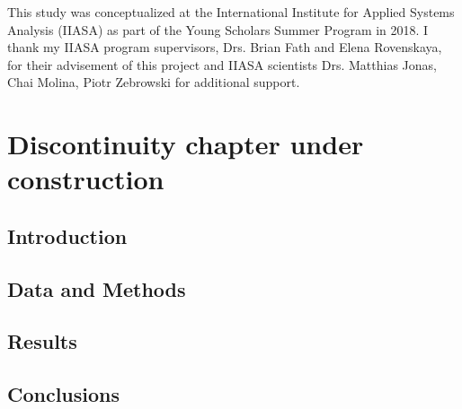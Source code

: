 \documentclass[12pt,twoside,openany]{reedthesis}
\begin{document}
This study was conceptualized at the International Institute for Applied Systems Analysis (IIASA) as part of the Young Scholars Summer Program in 2018. I thank my IIASA program supervisors, Drs. Brian Fath and Elena Rovenskaya, for their advisement of this project and IIASA scientists Drs. Matthias Jonas, Chai Molina, Piotr Zebrowski for additional support.

\hypertarget{discontinuity}{%
\chapter{Discontinuity chapter under construction}\label{discontinuity}}

\hypertarget{introduction-5}{%
\section{Introduction}\label{introduction-5}}

\hypertarget{data-and-methods-2}{%
\section{Data and Methods}\label{data-and-methods-2}}

\hypertarget{results-3}{%
\section{Results}\label{results-3}}

\hypertarget{conclusions}{%
\section{Conclusions}\label{conclusions}}
\end{document}
